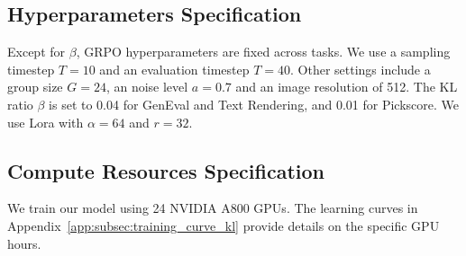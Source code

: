 \begin{table}[h]
\centering
{}
\end{table}




\subsection{Hyperparameters Specification}\label{app:subsubsec:synthetic-hyperp}
Except for $\beta$, GRPO hyperparameters are fixed across tasks. We use a sampling timestep $T=10$ and an evaluation timestep $T=40$. Other settings include a group size $G=24$, an noise level $a=0.7$ and an image resolution of 512. The KL ratio $\beta$ is set to 0.04 for GenEval and Text Rendering, and 0.01 for Pickscore. We use Lora with $\alpha=64$ and $r=32$.

\subsection{Compute Resources Specification}\label{app:subsubsec:synthetic-compute}
We train our model using 24 NVIDIA A800 GPUs. The learning curves in Appendix~\ref{app:subsec:training_curve_kl} provide details on the specific GPU hours.


